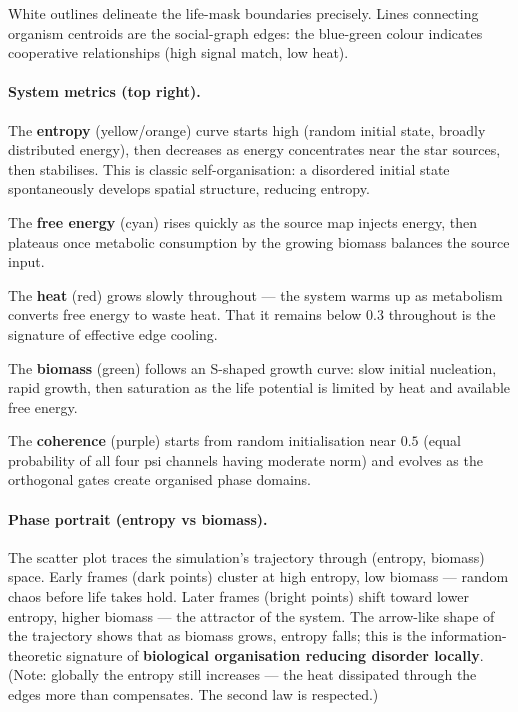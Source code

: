 \documentclass[12pt,a4paper]{article}
\begin{document}
White outlines delineate the life-mask boundaries precisely.
Lines connecting organism centroids are the social-graph edges:
the blue-green colour indicates cooperative relationships
(high signal match, low heat).

\paragraph{System metrics (top right).}
The \textbf{entropy} (yellow/orange) curve
starts high (random initial state, broadly distributed energy),
then decreases as energy concentrates near the star sources,
then stabilises.
This is classic self-organisation: a disordered initial state
spontaneously develops spatial structure, reducing entropy.

The \textbf{free energy} (cyan) rises quickly as the source map
injects energy, then plateaus once metabolic consumption
by the growing biomass balances the source input.

The \textbf{heat} (red) grows slowly throughout — the system
warms up as metabolism converts free energy to waste heat.
That it remains below 0.3 throughout is the signature of
effective edge cooling.

The \textbf{biomass} (green) follows an S-shaped growth curve:
slow initial nucleation, rapid growth,
then saturation as the life potential is limited by heat and
available free energy.

The \textbf{coherence} (purple) starts from random initialisation
near $0.5$ (equal probability of all four psi channels having
moderate norm) and evolves as the orthogonal gates create
organised phase domains.

\paragraph{Phase portrait (entropy vs biomass).}
The scatter plot traces the simulation's trajectory
through (entropy, biomass) space.
Early frames (dark points) cluster at high entropy,
low biomass — random chaos before life takes hold.
Later frames (bright points) shift toward lower entropy,
higher biomass — the attractor of the system.
The arrow-like shape of the trajectory shows that
as biomass grows, entropy falls;
this is the information-theoretic signature of
\textbf{biological organisation reducing disorder locally}.
(Note: globally the entropy still increases — the heat dissipated
through the edges more than compensates. The second law is respected.)
\end{document}
